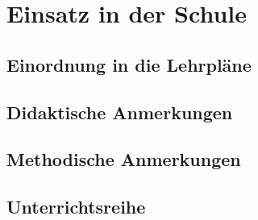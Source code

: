 \section{Einsatz in der Schule}
\subsection{Einordnung in die Lehrpläne}

\subsection{Didaktische Anmerkungen}

\subsection{Methodische Anmerkungen}

\subsection{Unterrichtsreihe}